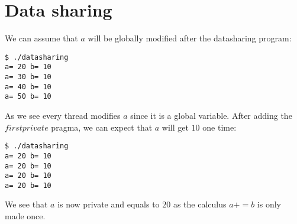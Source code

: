 \chapter{Data sharing}

We can assume that $a$ will be globally modified after the datasharing program:
\begin{verbatim}
$ ./datasharing 
a= 20 b= 10
a= 30 b= 10
a= 40 b= 10
a= 50 b= 10
\end{verbatim}

As we see every thread modifies $a$ since it is a global variable.
After adding the $firstprivate$ pragma, we can expect that $a$ will get $10$ one time:

\begin{verbatim}
$ ./datasharing 
a= 20 b= 10
a= 20 b= 10
a= 20 b= 10
a= 20 b= 10
\end{verbatim}

We see that $a$ is now private and equals to $20$ as the calculus $a += b$ is only made once.
